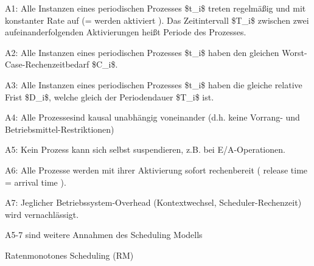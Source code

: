 \documentclass[a4paper]{article}
\begin{document}
\begin{multicols}{3}
    \begin{itemize*}
        \item
        A1: Alle Instanzen eines periodischen Prozesses \$t\_i\$ treten
        regelmäßig und mit konstanter Rate auf (= werden aktiviert ). Das
        Zeitintervall \$T\_i\$ zwischen zwei aufeinanderfolgenden
        Aktivierungen heißt Periode des Prozesses.
        \item
        A2: Alle Instanzen eines periodischen Prozesses \$t\_i\$ haben den
        gleichen Worst-Case-Rechenzeitbedarf \$C\_i\$.
        \item
        A3: Alle Instanzen eines periodischen Prozesses \$t\_i\$ haben die
        gleiche relative Frist \$D\_i\$, welche gleich der Periodendauer
        \$T\_i\$ ist.
        \item
        A4: Alle Prozessesind kausal unabhängig voneinander (d.h. keine
        Vorrang- und Betriebsmittel-Restriktionen)
        \item
        A5: Kein Prozess kann sich selbst suspendieren, z.B. bei
        E/A-Operationen.
        \item
        A6: Alle Prozesse werden mit ihrer Aktivierung sofort rechenbereit (
        release time = arrival time ).
        \item
        A7: Jeglicher Betriebssystem-Overhead (Kontextwechsel,
        Scheduler-Rechenzeit) wird vernachlässigt.
    \end{itemize*}

    A5-7 sind weitere Annahmen des Scheduling Modells

    Ratenmonotones Scheduling (RM)


\end{multicols}
\end{document}
